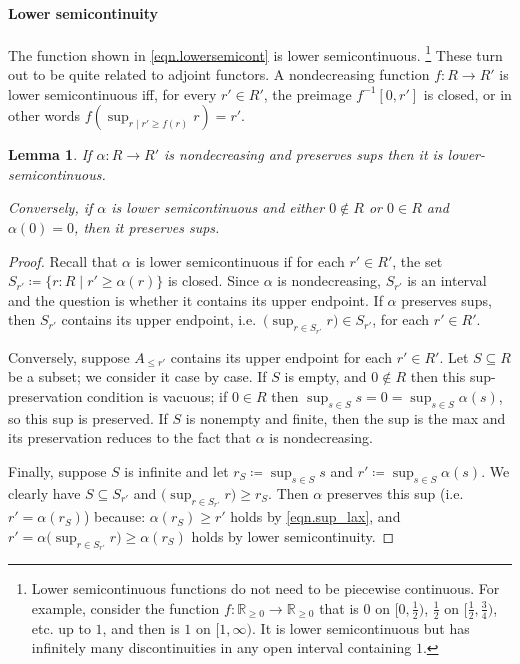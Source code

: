 \documentclass[11pt, one side, article]{memoir}
\theoremstyle{definition}
\theoremstyle{plain}
\newtheorem{lemma}[definitionx]{Lemma}
\renewcommand{\ss}{\subseteq}
\newcommand{\inv}{^{-1}}
\newcommand{\rr}{\mathbb{R}}
\newcommand{\rrnon}{\rr_{\geq0}}
\begin{document}
\paragraph{Lower semicontinuity}

The function shown in \cref{eqn.lowersemicont} is lower semicontinuous.%
\footnote{Lower semicontinuous functions do not need to be piecewise continuous. For example, consider the function $f\colon\rrnon\to\rrnon$ that is $0$ on $[0, \frac{1}{2})$, $\frac{1}{2}$ on $[\frac{1}{2}, \frac{3}{4})$, etc. up to $1$, and then is $1$ on $[1,\infty)$. It is lower semicontinuous but has infinitely many discontinuities in any open interval containing $1$.}  
 These turn out to be quite related to adjoint functors. A nondecreasing function $f\colon R\to R'$ is lower semicontinuous iff, for every $r'\in R'$, the preimage $f\inv[0,r']$ is closed, or in other words $f(\sup_{r\mid r'\geq f(r)}r)=r'$.

\begin{lemma}\label{lemma.sups_lower_semi}
If $\alpha\colon R\to R'$ is nondecreasing and preserves sups then it is lower-semicontinuous. 

Conversely, if $\alpha$ is lower semicontinuous and either $0\not\in R$ or $0\in R$ and $\alpha(0)=0$, then it preserves sups.
\end{lemma}
\begin{proof}
Recall that $\alpha$ is lower semicontinuous if for each $r'\in R'$, the set $S_{r'}\coloneqq\{r:R\mid r'\geq\alpha(r)\}$ is closed. Since $\alpha$ is nondecreasing, $S_{r'}$ is an interval and the question is whether it contains its upper endpoint. If $\alpha$ preserves sups, then $S_{r'}$ contains its upper endpoint, i.e.\ $\big(\sup_{r\in S_{r'}}r\big)\in S_{r'}$, for each $r'\in R'$. 

Conversely, suppose $A_{\leq r'}$ contains its upper endpoint for each $r'\in R'$. Let $S\ss R$ be a subset; we consider it case by case. If $S$ is empty, and $0\not\in R$ then this sup-preservation condition is vacuous; if $0\in R$ then $\sup_{s\in S}s=0=\sup_{s\in S}\alpha(s)$, so this sup is preserved. If $S$ is nonempty and finite, then the sup is the max and its preservation reduces to the fact that $\alpha$ is nondecreasing. 

Finally, suppose $S$ is infinite and let $r_S\coloneqq\sup_{s\in S}s$ and $r'\coloneqq\sup_{s\in S}\alpha(s)$. We clearly have $S\ss S_{r'}$ and $\big(\sup_{r\in S_{r'}}r\big)\geq r_S$. Then $\alpha$ preserves this sup (i.e.\ $r'=\alpha(r_S)$) because: $\alpha(r_S)\geq r'$ holds by \eqref{eqn.sup_lax}, and $r'=\alpha\big(\sup_{r\in S_{r'}}r\big)\geq\alpha(r_S)$ holds by lower semicontinuity.
\end{proof}
\end{document}
